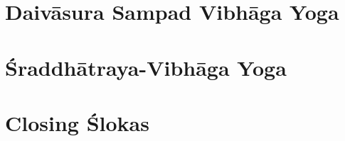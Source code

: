 \documentclass{scrbook}
\begin{document}
\chapter{Daivāsura Sampad Vibhāga Yoga}
\begin{multicols}{2}
    
\end{multicols}

\chapter{Śraddhātraya-Vibhāga Yoga}
\begin{multicols}{2}
    
\end{multicols}

\backmatter
\chapter{Closing Ślokas}

\end{document}
